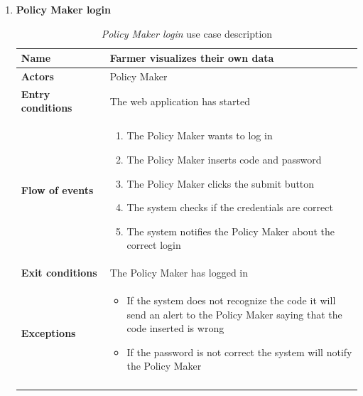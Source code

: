 \begin{enumerate}
    \item \textbf{Policy Maker login}
    \begin{longtable}{p{0.26\linewidth}p{0.75\linewidth}}
        \toprule
        \textbf{Name} & \textbf{Farmer visualizes their own data} \\
        \midrule
        \textbf{Actors} & Policy Maker \\
        \midrule
        \textbf{Entry conditions} & The web application has started\\
        \midrule
        \textbf{Flow of events} & 
        \begin{enumerate}
            \item The Policy Maker wants to log in 
            \item The Policy Maker inserts code and password
            \item The Policy Maker clicks the submit button
            \item The system checks if the credentials are correct
            \item The system notifies the Policy Maker about the correct login
        \end{enumerate} \\
        \midrule
        \textbf{Exit conditions} & The Policy Maker has logged in\\
        \midrule
        \textbf{Exceptions} & 
        \begin{itemize}
            \item If the system does not recognize the code it will send an alert  to the Policy Maker saying that the code inserted is wrong
            \item If the password is not correct the system will notify the Policy Maker 
        \end{itemize}\\
        \bottomrule
        \caption{\emph{Policy Maker login} use case description}
    \end{longtable}


\end{enumerate}
